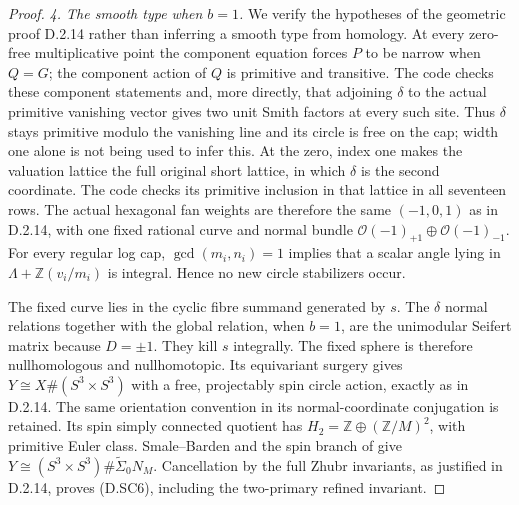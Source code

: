\begin{proof}
\emph{4. The smooth type when $b=1$.}
We verify the hypotheses of the geometric proof D.2.14 rather than
inferring a smooth type from homology. At every zero-free
multiplicative point the component equation forces $P$ to be narrow
when $Q=G$; the component action of $Q$ is primitive and transitive. The code
checks these component statements and, more directly, that adjoining
$\delta$ to the actual primitive vanishing vector gives two unit
Smith factors at every such site. Thus $\delta$ stays primitive
modulo the vanishing line and its circle is free on the cap; width
one alone is not being used to infer this. At the zero, index one makes the valuation lattice the full original
short lattice, in which $\delta$ is the second coordinate. The code
checks its primitive inclusion in that lattice in all seventeen rows.
The actual hexagonal fan weights are therefore the same $(-1,0,1)$ as in D.2.14, with one fixed rational curve and
normal bundle $\mathcal O(-1)_{+1}\oplus\mathcal O(-1)_{-1}$.
For every regular log cap, $\gcd(m_i,n_i)=1$ implies that a scalar
angle lying in $\Lambda+\mathbb Z(v_i/m_i)$ is integral. Hence no
new circle stabilizers occur.

The fixed curve lies in the cyclic fibre summand generated by $s$.
The $\delta$ normal relations together with the global relation,
when $b=1$, are the unimodular Seifert matrix because $D=\pm1$.
They kill $s$ integrally. The fixed sphere is therefore nullhomologous
and nullhomotopic. Its equivariant surgery gives
$Y\cong X\#(S^3\times S^3)$ with a free, projectably spin circle
action, exactly as in D.2.14. The same orientation convention in its
normal-coordinate conjugation is retained. Its spin simply connected
quotient has $H_2=\mathbb Z\oplus(\mathbb Z/M)^2$, with primitive
Euler class. Smale--Barden and the spin branch of
\cite[Theorem A]{manGR25} give
$Y\cong(S^3\times S^3)\#\widetilde\Sigma_0N_M$.
Cancellation by the full Zhubr invariants, as justified in D.2.14,
proves (D.SC6), including the two-primary refined invariant.
\end{proof}
